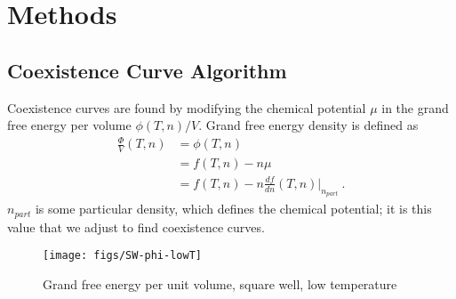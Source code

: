 \documentclass[letterpaper,twocolumn,amsmath,amssymb,prb]{revtex4-1}
\newcommand{\npart}{\ensuremath{n_\textit{part}}}
\begin{document}
\section{Methods}\label{sec:methods}

\subsection{Coexistence Curve Algorithm}\label{subsec:coexis}
Coexistence curves are found by modifying the chemical potential $\mu$
in the grand free energy per volume $\phi(T,n)/V$. Grand free energy
density is defined as
\begin{align}
  \frac{\Phi}{V}(T,n) &= \phi(T,n) \nonumber \\
                 &= f(T,n) - n\mu \nonumber \\
                 &= f(T,n) - n\frac{df}{dn}(T,n)\bigg|_{\npart}\ .
\end{align}
$\npart$ is some particular density, which defines the chemical
potential; it is this value that we adjust to find coexistence curves.

\begin{figure}
  \centering
  \texttt{[image: figs/SW-phi-lowT]}
  \caption{Grand free energy per unit volume, square well, low temperature}
  \label{fig:SW-phi-lowT}
\end{figure}
\end{document}
